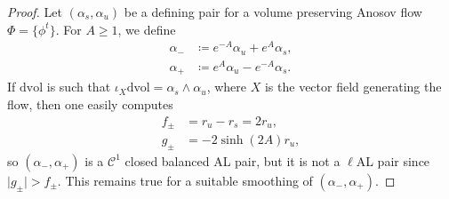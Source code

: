 \documentclass[letterpaper, 11pt]{article}
\numberwithin{equation}{section}
\begin{document}
\begin{proof} Let $(\alpha_s, \alpha_u)$ be a defining pair for a volume preserving Anosov flow $\Phi = \{\phi^t\}$. For $A \geq 1$, we define
\begin{align*}
\alpha_- &\coloneqq e^{-A} \alpha_u + e^A \alpha_s,\\
\alpha_+ &\coloneqq e^A \alpha_u - e^{-A} \alpha_s.
\end{align*}
If $\mathrm{dvol}$ is such that $\iota_X \mathrm{dvol} = \alpha_s \wedge \alpha_u$, where $X$ is the vector field generating the flow, then one easily computes
\begin{align*}
f_\pm &= r_u - r_s = 2 r_u, \\ 
g_\pm &= - 2 \sinh(2A) r_u, 
\end{align*}
so $(\alpha_-, \alpha_+)$ is a $\mathcal{C}^1$ closed balanced AL pair, but it is not a $\ell$AL pair since $\vert g_\pm \vert > f_\pm$. This remains true for a suitable smoothing of $(\alpha_-, \alpha_+)$.


\end{proof}
\end{document}
